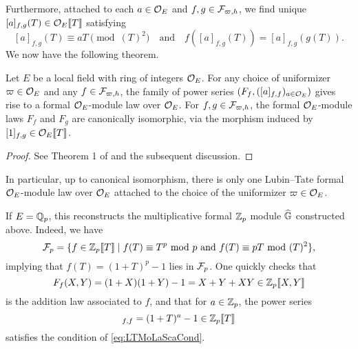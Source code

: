 \documentclass[../main.tex]{subfiles}
\begin{document}
Furthermore, attached to each $a \in \mathcal{O}_E$ and $f,g \in \mathcal{F}_{\varpi,h}$, we find
unique $[a]_{f,g}(T) \in \mathcal{O}_E\llbracket T \rrbracket$ satisfying
\begin{equation}\label{eq:LTMoLaScaCond}
  [a]_{f,g}(T) \equiv aT \pmod {(T)^2} \quad \text{and} \quad
  f([a]_{f,g}(T)) = [a]_{f,g}(g(T)).
\end{equation}
We now have the following theorem.
\begin{thm}\label{thm:LTModLaw}
  Let $E$ be a local field with ring of integers $\mathcal{O}_E$. For any choice of 
  uniformizer $\varpi \in \mathcal{O}_E$ and any $f \in \mathcal{F}_{\varpi,h}$, the family of power
  series $(F_f, ([a]_{f,f})_{a \in \mathcal{O}_E})$
  gives rise to a formal $\mathcal{O}_E$-module law over $\mathcal{O}_E$. For 
  $f,g \in \mathcal{F}_{\varpi,h}$, the formal $\mathcal{O}_E$-module laws $F_f$ and $F_g$ are
  canonically isomorphic, via the morphism induced by $[1]_{f,g} \in \mathcal{O}_E\llbracket
  T \rrbracket$. 
\begin{proof}
  See Theorem 1 of \cite{LubinTateFormalMult} and the subsequent discussion.
\end{proof}
\end{thm}
In particular, up to canonical isomorphism, there is only one Lubin--Tate formal
$\mathcal{O}_E$-module law over $\mathcal{O}_E$ attached to the choice of the uniformizer $\varpi \in
\mathcal{O}_E$. 

\begin{xpl}
  If $E = \mathbb{Q}_p$, this reconstructs the multiplicative formal 
  $\mathbb{Z}_p$ module $\widehat{\mathbb{G}}$ constructed above. Indeed, we have 
  \begin{equation*}
    \mathcal{F}_p = \{f \in \mathbb{Z}_p\llbracket T \rrbracket \mid f(T) \equiv T^p \text{ mod } p
    \text{ and } f(T) \equiv pT \text{ mod } (T)^2 \},
  \end{equation*}
  implying that $f(T) = (1+T)^p-1$ lies in $\mathcal{F}_p$.  
  One quickly checks that 
  \begin{equation*}
    F_f(X,Y) = (1+X)(1+Y) - 1 = X + Y + XY \in \mathbb{Z}_p \llbracket X,Y \rrbracket
  \end{equation*}
  is the addition law associated to $f$, and that 
  for $a \in \mathbb{Z}_p$, the power series
  \begin{equation*}
    [a]_{f,f} = (1+T)^{a} - 1 \in \Z_p \llbr T \rrbr
  \end{equation*}
  satisfies the condition of \eqref{eq:LTMoLaScaCond}. 
\end{xpl}
\end{document}
